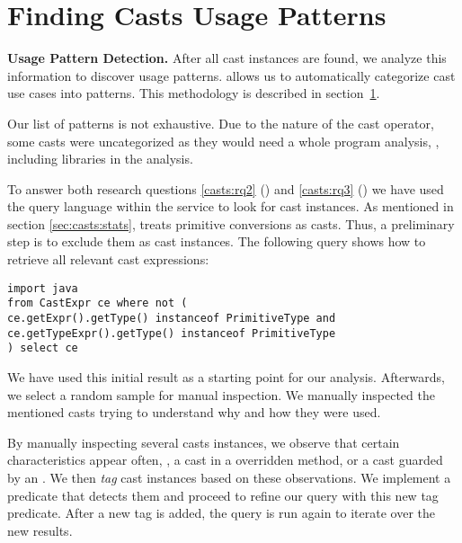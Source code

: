 \section{Finding Casts Usage Patterns}
\label{sec:casts:methodology}





\textbf{Usage Pattern Detection.}
After all cast instances are found, we analyze this information to discover usage patterns.
\ql{} allows us to automatically categorize cast use cases into patterns.
This methodology is described in section~\ref{sec:casts:methodology}.

Our list of patterns is not exhaustive.
Due to the nature of the cast operator, some casts were uncategorized as they would need a whole program analysis, \eg{}, including libraries in the analysis.






To answer both research questions
\ref{casts:rq2} (\emph{\crqB}) and \ref{casts:rq3} (\emph{\crqC})
we have used the \ql{} query language within the \lgtm{} service to look for cast instances.
%
As mentioned in section \ref{sec:casts:stats}, \ql{} treats primitive conversions as casts.
Thus, a preliminary step is to exclude them as cast instances.
The following \ql{} query shows how to retrieve all relevant cast expressions:

\begin{lstlisting}[style=ql,caption=\ql{} query to retrieve all relevant cast expressions.]
import java
from CastExpr ce where not (
ce.getExpr().getType() instanceof PrimitiveType and
ce.getTypeExpr().getType() instanceof PrimitiveType
) select ce
\end{lstlisting}

We have used this initial result as a starting point for our analysis.
Afterwards, we select a random sample for manual inspection.
We manually inspected the mentioned casts trying to understand
why and how they were used.

By manually inspecting several casts instances,
we observe that certain characteristics appear often, \eg,
a cast in a overridden method, or a cast guarded by an .
We then \emph{tag} cast instances based on these observations.
We implement a \ql{} predicate that detects them and proceed
to refine our query with this new tag predicate.
After a new tag is added, the query is run again to iterate over the new results.

